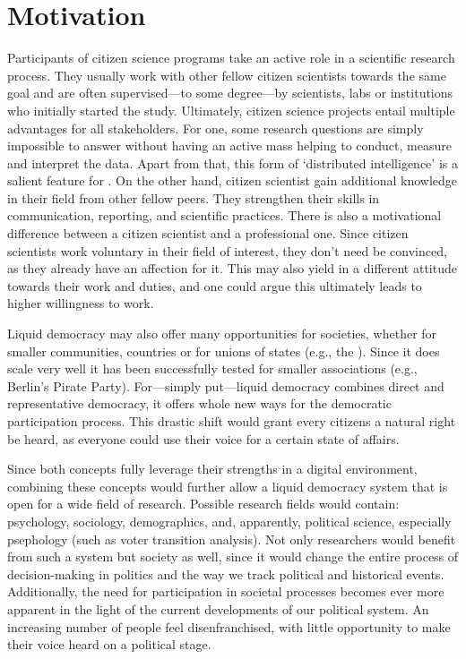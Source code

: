 \section{Motivation}
\label{sec:Motivation}

Participants of citizen science programs take an active role in a scientific research process. They usually work with other fellow citizen scientists towards the same goal and are often supervised---to some degree---by scientists, labs or institutions who initially started the study. Ultimately, citizen science projects entail multiple advantages for all stakeholders. For one, some research questions are simply impossible to answer without having an active mass helping to conduct, measure and interpret the data.  Apart from that, this form of ‘distributed intelligence’ is a salient feature for . On the other hand, citizen scientist gain additional knowledge in their field from other fellow peers. They strengthen their skills in communication, reporting, and scientific practices. There is also a motivational difference between a citizen scientist and a professional one. Since citizen scientists work voluntary in their field of interest, they don’t need be convinced, as they already have an affection for it. This may also yield in a different attitude towards their work and duties, and one could argue this ultimately leads to higher willingness to work.

Liquid democracy may also offer many opportunities for societies, whether for smaller communities, countries or for unions of states (e.g., the ). Since it does scale very well it has been successfully tested for smaller associations (e.g., Berlin’s Pirate Party). For---simply put---liquid democracy combines direct and representative democracy, it offers whole new ways for the democratic participation process. This drastic shift would grant every citizens a natural right be heard, as everyone could use their voice for a certain state of affairs.

Since both concepts fully leverage their strengths in a digital environment, combining these concepts would further allow a liquid democracy system that is open for a wide field of research. Possible research fields would contain: psychology, sociology, demographics, and, apparently, political science, especially psephology (such as voter transition analysis). Not only researchers would benefit from such a system but society as well, since it would change the entire process of decision-making in politics and the way we track political and historical events. Additionally, the need for participation in societal processes becomes ever more apparent in the light of the current developments of our political system. An increasing number of people feel disenfranchised, with little opportunity to make their voice heard on a political stage.


